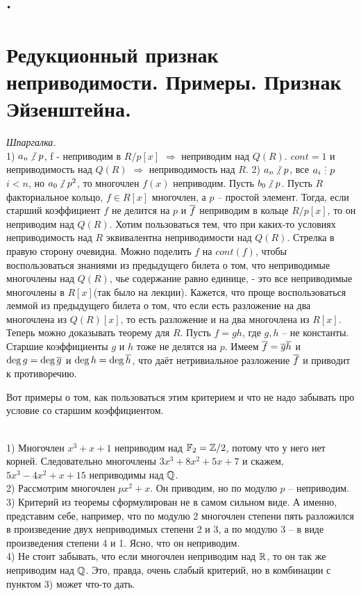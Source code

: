 \texttt{\texttt{•}}\section{
 Редукционный признак неприводимости. Примеры. Признак Эйзенштейна.
}
{\it Шпаргалка.}\\
 1) $a_n \ndi p$, f - неприводим в $R/p[x]$ $\Rightarrow$ неприводим над $Q(R)$. $cont = 1$ и неприводимость над $Q(R)$ $\Rightarrow$ неприводимость над $R$. 2) $a_n \ndi p$, все $a_i \di p$ $i<n$, но $a_0\ndi p^2$, то многочлен $f(x)$ неприводим. Пусть $b_0 \ndi p$.
 Пусть $R$ факториальное кольцо, $f \in  R[x]$ многочлен, а $p$ -- простой элемент. Тогда, если старший коэффициент $f$ не делится на $p$ и $\overline{f}$ неприводим в кольце $R/p[x]$, то он неприводим над $Q(R)$. 
\proof Хотим пользоваться тем, что при каких-то условиях неприводимость над $R$ эквивалентна неприводимости над $Q(R)$. Стрелка в правую сторону очевидна.
Можно поделить $f$ на $cont(f)$, чтобы воспользоваться знаниями из предыдущего билета о том, что неприводимые многочлены над $Q(R)$, чье содержание равно единице, - это все неприводимые многочлены в $R[x]$(так было на лекции). Кажется, что проще воспользоваться леммой из предыдущего билета о том, что если есть разложение
на два многочлена из $Q(R)[x]$, то есть разложение и на два многочлена из $R[x]$.
 Теперь можно доказывать теорему для $R$. Пусть $f=gh$, где $g,h$ --  не константы. Старшие коэффициенты $g$ и $h$ тоже не делятся на $p$. Имеем $\overline{f}= \overline{g}\overline{h}$ и $\deg g = \deg \overline{g}$ и $\deg h = \deg \overline{h}$, что даёт нетривиальное разложение $\overline{f}$ и приводит к противоречию.
\endproof
\ethrm

Вот примеры о том, как пользоваться этим критерием и что не надо забывать про условие со старшим коэффициентом. 

\exm\\
1) Многочлен $x^3+x+1$ неприводим над $\mathbb{F}_2=\mathbb{Z}/2$, потому что у него нет корней. Следовательно многочлены $3x^3+8x^2+5x+7$ и скажем, $5x^3-4x^2+x+15$ неприводимы над $\mathbb{Q}$.\\
2) Рассмотрим многочлен $px^2+x$. Он приводим, но по модулю $p$ -- неприводим.\\
3) Критерий из теоремы сформулирован не в самом сильном виде. А именно, представим себе, например, что по модулю 2 многочлен степени пять разложился в произведение двух неприводимых степени 2 и 3, а по модулю 3 -- в виде произведения степени 4 и 1. Ясно, что он неприводим.\\
4) Не стоит забывать, что если многочлен неприводим над $\mathbb{R}$, то он так же неприводим над $\mathbb{Q}$. Это, правда, очень слабый критерий, но в комбинации с пунктом 3) может что-то дать.\\



